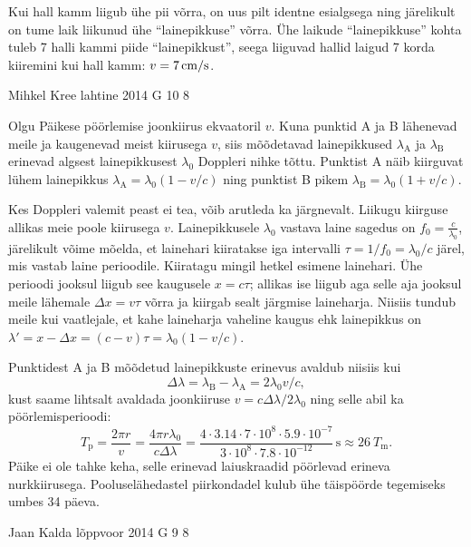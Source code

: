 \documentclass[11pt, twoside]{article}
\begin{document}
{{\ifSolution
Kui hall kamm liigub ühe pii võrra, on uus pilt identne esialgsega ning järelikult on tume laik liikunud ühe \enquote{lainepikkuse} võrra. 
Ühe laikude \enquote{lainepikkuse} kohta tuleb 7 halli kammi piide \enquote{lainepikkust}, seega liiguvad hallid laigud 7 korda kiiremini kui hall kamm: $v=\SI 7{cm/s}$.
\fi
}

{Mihkel Kree} %
{lahtine} %
{2014} %
{G 10} %
{8} %
{

\ifSolution
Olgu Päikese pöörlemise joonkiirus ekvaatoril $v$. Kuna punktid A ja B lähenevad meile ja kaugenevad meist kiirusega $v$, siis mõõdetavad lainepikkused $\lambda_\text{A}$ ja $\lambda_\text{B}$ erinevad algsest lainepikkusest $\lambda_0$ Doppleri nihke tõttu. Punktist A näib kiirguvat lühem lainepikkus $\lambda_\text{A}=\lambda_0(1-v/c)$ ning punktist B pikem $\lambda_\text{B}=\lambda_0(1+v/c)$.

Kes Doppleri valemit peast ei tea, võib arutleda ka järgnevalt. Liikugu kiirguse allikas meie poole kiirusega $v$. Lainepikkusele $\lambda_0$ vastava laine sagedus on $f_0=\frac{c}{\lambda_0}$, järelikult võime mõelda, et lainehari kiiratakse iga intervalli $\tau = 1/f_0 = \lambda_0/c$ järel, mis vastab laine perioodile. Kiiratagu mingil hetkel esimene lainehari. Ühe perioodi jooksul liigub see kaugusele $x=c\tau$; allikas ise liigub aga selle aja jooksul meile lähemale $\Delta x = v\tau$ võrra ja kiirgab sealt järgmise laineharja. Niisiis tundub meile kui vaatlejale, et kahe laineharja vaheline kaugus ehk lainepikkus on $\lambda'=x-\Delta x=(c-v)\tau = \lambda_0(1-v/c)$.

Punktidest A ja B mõõdetud lainepikkuste erinevus avaldub niisiis kui 
\[
\Delta\lambda = \lambda_\text{B}-\lambda_\text{A} = 2\lambda_0 v/c,
\]
kust saame lihtsalt avaldada joonkiiruse $v=c\Delta\lambda/2\lambda_0$ ning selle abil ka pöörlemisperioodi:
\[
T_\text{p}=\frac{2\pi r}{v}=\frac{4 \pi r \lambda_0}{c\Delta \lambda}=
\frac{4 \cdot 3.14 \cdot 7\cdot 10^8 \cdot 5.9 \cdot 10^{-7}}{3\cdot 10^8\cdot 7.8\cdot 10^{-12}}\,\text{s}\approx \SI{26}{\textit{T}_\text{m}}.
\]
Päike ei ole tahke keha, selle erinevad laiuskraadid pöörlevad erineva nurkkiirusega. Pooluselähedastel piirkondadel kulub ühe täispöörde tegemiseks umbes 34 päeva.
\fi
}

{Jaan Kalda} %
{lõppvoor} %
{2014} %
{G 9} %
{8} %
{

}}
\end{document}
